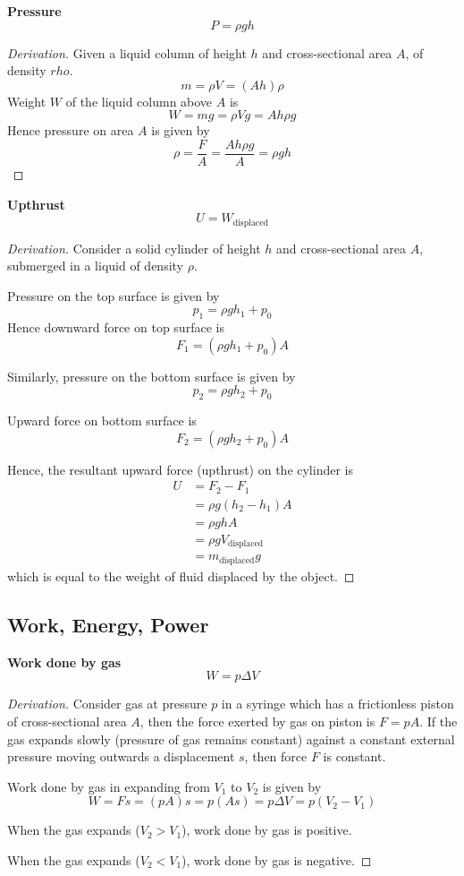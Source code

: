 \textbf{Pressure}
\[ P=\rho g h \]

\begin{proof}[Derivation]
Given a liquid column of height $h$ and cross-sectional area $A$, of density $rho$.
\[ m = \rho V = (Ah)\rho\]
Weight $W$ of the liquid column above $A$ is 
\[ W = mg = \rho Vg = Ah\rho g \]
Hence pressure on area $A$ is given by
\[ \rho = \frac{F}{A} = \frac{Ah\rho g}{A} = \rho g h \]
\end{proof}

\textbf{Upthrust}
\[ U=W_{\text{displaced}} \]

\begin{proof}[Derivation]
Consider a solid cylinder of height $h$ and cross-sectional area $A$, submerged in a liquid of density $\rho$.

Pressure on the top surface is given by 
\[ p_1 = \rho g h_1 + p_0 \]
Hence downward force on top surface is 
\[ F_1 = (\rho g h_1 + p_0)A \]

Similarly, pressure on the bottom surface is given by 
\[ p_2 = \rho g h_2 + p_0 \]

Upward force on bottom surface is 
\[ F_2 = (\rho g h_2 + p_0)A \]

Hence, the resultant upward force (upthrust) on the cylinder is 
\begin{align*}
U &= F_2 - F_1 \\
&= \rho g (h_2 - h_1) A \\
&= \rho g h A \\
&= \rho g V_{\text{displaced}} \\
&= m_{\text{displaced}} g
\end{align*}
which is equal to the weight of fluid displaced by the object.
\end{proof}
\pagebreak

\subsection{Work, Energy, Power}
\textbf{Work done by gas}
\[ W = p \Delta V \]

\begin{proof}[Derivation]
Consider gas at pressure $p$ in a syringe which has a frictionless piston of cross-sectional area $A$, then the force exerted by gas on piston is $F=pA$. If the gas expands slowly (pressure of gas remains constant) against a constant external pressure moving outwards a displacement $s$, then force $F$ is constant.

Work done by gas in expanding from $V_1$ to $V_2$ is given by
\[ W = Fs = (pA)s = p(As) = p \Delta V = p (V_2 - V_1) \]

When the gas expands ($V_2>V_1$), work done by gas is positive.

When the gas expands ($V_2<V_1$), work done by gas is negative.
\end{proof}

